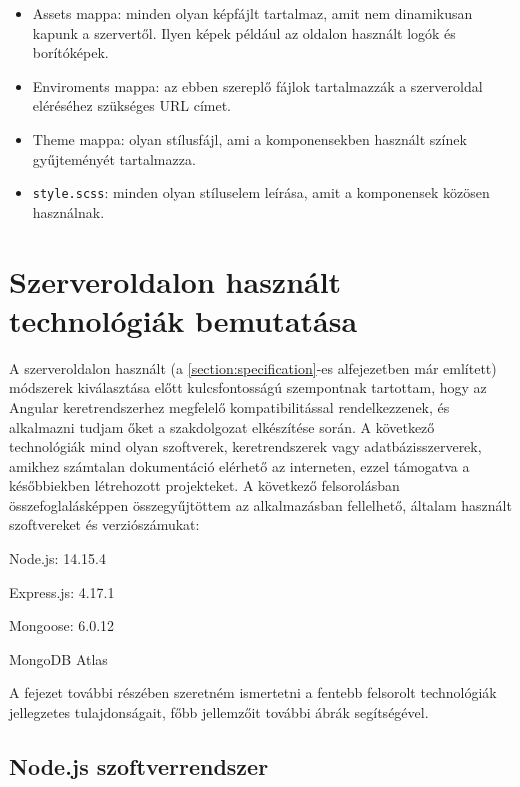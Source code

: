 \begin{itemize}
	\item Assets mappa: minden olyan képfájlt tartalmaz, amit nem dinamikusan kapunk a szervertől. Ilyen képek például az oldalon használt logók és borítóképek.
	\item Enviroments mappa: az ebben szereplő fájlok tartalmazzák a szerveroldal eléréséhez szükséges URL címet.
	\item Theme mappa: olyan stílusfájl, ami a komponensekben használt színek gyűjteményét tartalmazza.
	\item \verb|style.scss|: minden olyan stíluselem leírása, amit a komponensek közösen használnak.
\end{itemize}

\section{Szerveroldalon használt technológiák bemutatása}
A szerveroldalon használt (a \ref{section:specification}-es alfejezetben már említett) módszerek kiválasztása előtt kulcsfontosságú szempontnak tartottam, hogy az Angular keretrendszerhez megfelelő kompatibilitással rendelkezzenek, és alkalmazni tudjam őket a szakdolgozat elkészítése során. A következő technológiák mind olyan szoftverek, keretrendszerek vagy adatbázisszerverek, amikhez számtalan  dokumentáció elérhető az interneten, ezzel támogatva a későbbiekben létrehozott projekteket. A következő felsorolásban összefoglalásképpen összegyűjtöttem az alkalmazásban fellelhető, általam használt szoftvereket és verziószámukat:

\begin{compactitem}
	\item Node.js: 14.15.4
	\item Express.js: 4.17.1
	\item Mongoose: 6.0.12
	\item MongoDB Atlas
\end{compactitem}

\bigskip
A fejezet további részében szeretném ismertetni a fentebb felsorolt technológiák jellegzetes tulajdonságait, főbb jellemzőit további ábrák segítségével.

\subsection{Node.js szoftverrendszer}

